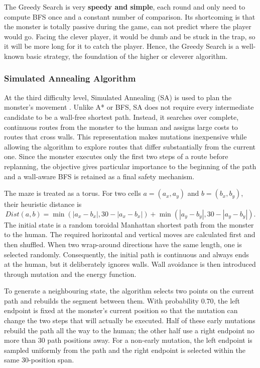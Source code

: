 \documentclass[12pt,a4paper]{article}
\begin{document}
The Greedy Search is very \textbf{speedy and simple}, each round and only need to compute BFS once and a constant number of comparison. Its shortcoming is that the monster is totally passive during the game, can not predict where the player would go. Facing the clever player, it would be dumb and be stuck in the trap, so it will be more long for it to catch the player. Hence, the Greedy Search is a well-known basic strategy, the foundation of the higher or cleverer algorithm.

\subsubsection{Simulated Annealing Algorithm}

At the third difficulty level, Simulated Annealing (SA) is used to plan the
monster's movement \cite{kirkpatrick1983sa}. Unlike A* or BFS, SA does not require every intermediate
candidate to be a wall-free shortest path. Instead, it searches over complete,
continuous routes from the monster to the human and assigns large costs to
routes that cross walls. This representation makes mutations inexpensive while
allowing the algorithm to explore routes that differ substantially from the
current one. Since the monster executes only the first two steps of a route
before replanning, the objective gives particular importance to the beginning
of the path and a wall-aware BFS is retained as a final safety mechanism.

The maze is treated as a torus. For two cells $a=(a_x,a_y)$ and
$b=(b_x,b_y)$, their heuristic distance is
\[
Dist(a,b)=
\min(|a_x-b_x|,30-|a_x-b_x|)
+\min(|a_y-b_y|,30-|a_y-b_y|).
\]
The initial state is a random toroidal Manhattan shortest path from the monster
to the human. The required horizontal and vertical moves are calculated first
and then shuffled. When two wrap-around directions have the same length, one is
selected randomly. Consequently, the initial path is continuous and always
ends at the human, but it deliberately ignores walls. Wall avoidance is then
introduced through mutation and the energy function.

To generate a neighbouring state, the algorithm selects two points on the
current path and rebuilds the segment between them. With probability $0.70$,
the left endpoint is fixed at the monster's current position so that the
mutation can change the two steps that will actually be executed. Half of these
early mutations rebuild the path all the way to the human; the other half use a
right endpoint no more than 30 path positions away. For a non-early mutation,
the left endpoint is sampled uniformly from the path and the right endpoint is
selected within the same 30-position span.
\end{document}
